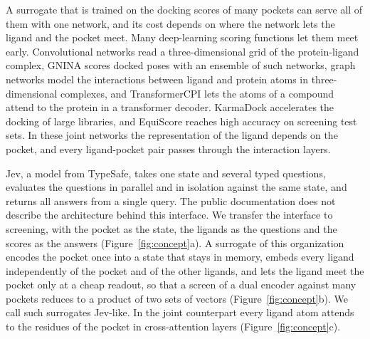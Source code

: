 A surrogate that is trained on the docking scores of many pockets can serve all of them with one network, and its cost depends on where the network lets the ligand and the pocket meet. Many deep-learning scoring functions let them meet early. Convolutional networks read a three-dimensional grid of the protein-ligand complex,\cite{ragoza2017,stepniewska2018,francoeur2020} GNINA scores docked poses with an ensemble of such networks,\cite{gnina} graph networks model the interactions between ligand and protein atoms in three-dimensional complexes,\cite{jiang2021,moon2022,lai2024} and TransformerCPI lets the atoms of a compound attend to the protein in a transformer decoder.\cite{chen2020} KarmaDock accelerates the docking of large libraries,\cite{zhang2023} and EquiScore reaches high accuracy on screening test sets.\cite{cao2024} In these joint networks the representation of the ligand depends on the pocket, and every ligand-pocket pair passes through the interaction layers.

Jev, a model from TypeSafe, takes one state and several typed questions, evaluates the questions in parallel and in isolation against the same state, and returns all answers from a single query.\cite{jev,jevdocs} The public documentation does not describe the architecture behind this interface.\cite{jevdocs} We transfer the interface to screening, with the pocket as the state, the ligands as the questions and the scores as the answers (Figure~\ref{fig:concept}a). A surrogate of this organization encodes the pocket once into a state that stays in memory, embeds every ligand independently of the pocket and of the other ligands, and lets the ligand meet the pocket only at a cheap readout, so that a screen of a dual encoder against many pockets reduces to a product of two sets of vectors (Figure~\ref{fig:concept}b). We call such surrogates Jev-like. In the joint counterpart every ligand atom attends to the residues of the pocket in cross-attention layers (Figure~\ref{fig:concept}c).\cite{vaswani2017}

